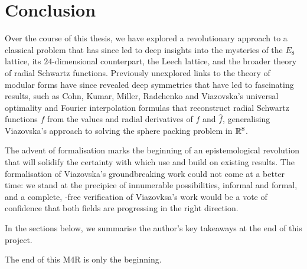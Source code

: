 \chapter{Conclusion}
\label{Ch6:Chapter}
\thispagestyle{empty}

Over the course of this thesis, we have explored a revolutionary approach to a classical problem that has since led to deep insights into the mysteries of the $E_8$ lattice, its $24$-dimensional counterpart, the Leech lattice, and the broader theory of radial Schwartz functions. Previously unexplored links to the theory of modular forms have since revealed deep symmetries that have led to fascinating results, such as Cohn, Kumar, Miller, Radchenko and Viazovska's universal optimality and Fourier interpolation formulas \cite{UniversalOptimality} that reconstruct radial Schwartz functions $f$ from the values and radial derivatives of $f$ and $\hat{f}$, generalising Viazovska's approach to solving the sphere packing problem in $\mathbb{R}^8$.

The advent of formalisation marks the beginning of an epistemological revolution that will solidify the certainty with which use and build on existing results. The formalisation of Viazovska's groundbreaking work could not come at a better time: we stand at the precipice of innumerable possibilities, informal and formal, and a complete, \sorry-free verification of Viazovksa's work would be a vote of confidence that both fields are progressing in the right direction.

In the sections below, we summarise the author's key takeaways at the end of this project.





The end of this M4R is only the beginning.